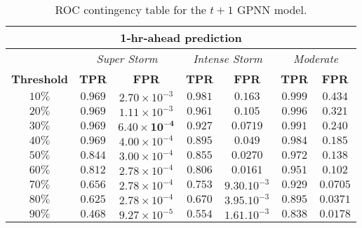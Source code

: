 \begin{table}[h]
	\centering
	\caption{ROC contingency table for the $t+1$ GPNN model.}
	\label{table:rocgpnn1h}
	\begin{tabular}{c| c c | c c | c c}
		\hline
		\multicolumn{7}{c}{\textbf{1‐hr‐ahead prediction}} \\ 
		\hline
		 & \multicolumn{2}{c}{\textit{Super Storm}} & \multicolumn{2}{c}{\textit{Intense Storm}} & \multicolumn{2}{c}{\textit{Moderate}} \\ 
		\hline
		\textbf{Threshold} & \textbf{TPR} & \textbf{FPR} & \textbf{TPR} & \textbf{FPR} & \textbf{TPR} & \textbf{FPR} \\ 
		\hline
		$10\%$ & $0.969$ & $2.70\times10^{-3}$ & $0.981$ & $0.163$ & $0.999$ &$ 0.434$ \\ 
		$20\%$ & $0.969$ & $1.11\times10^{-3}$ & $0.961$ & $0.105$ & $0.996$ & $0.321$ \\ 
		$30\%$ & $\mathbf{0.969}$ & $\mathbf{6.40\times10^{-4}}$ & $\mathbf{0.927}$ & $\mathbf{0.0719}$ & $0.991$ & $0.240$ \\ 
		$40\%$ & $0.969$ & $4.00\times10^{-4}$ & $0.895$ & $0.049$ & $0.984$ & $0.185$ \\ 
		$50\%$ & $0.844$ & $3.00\times10^{-4}$ & $0.855$ & $0.0270$ & $0.972$ & $0.138$ \\ 
		$60\%$ & $0.812$ & $2.78\times10^{-4}$ & $0.806$ & $0.0161$ & $0.951$ & $0.102$ \\ 
		$70\%$ & $0.656$ & $2.78\times10^{-4}$ & $0.753$ & $9.30.10^{-3}$ & $\mathbf{0.929}$ & $\mathbf{0.0705}$ \\ 
		$80\%$ & $0.625$ & $2.78\times10^{-4}$ & $0.670$ & $3.95.10^{-3}$ & $0.895$ & $0.0371$ \\ 
		$90\%$ & $0.468$ & $9.27\times10^{-5}$ & $0.554$ & $1.61.10^{-3}$ & $0.838$ & $0.0178$\\
		\hline
	\end{tabular}
	
\end{table}

